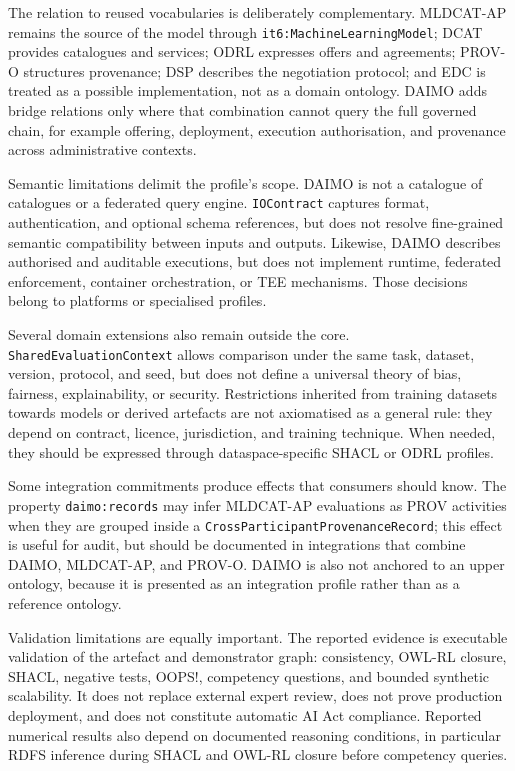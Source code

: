 \documentclass[Afour,sagev,times]{sagej}
\newcommand{\code}[1]{\texttt{#1}}
\begin{document}
The relation to reused vocabularies is deliberately complementary. MLDCAT-AP remains the source of the model through \code{it6:MachineLearningModel}; DCAT provides catalogues and services; ODRL expresses offers and agreements; PROV-O structures provenance; DSP describes the negotiation protocol; and EDC is treated as a possible implementation, not as a domain ontology. DAIMO adds bridge relations only where that combination cannot query the full governed chain, for example offering, deployment, execution authorisation, and provenance across administrative contexts.

Semantic limitations delimit the profile's scope. DAIMO is not a catalogue of catalogues or a federated query engine. \code{IOContract} captures format, authentication, and optional schema references, but does not resolve fine-grained semantic compatibility between inputs and outputs. Likewise, DAIMO describes authorised and auditable executions, but does not implement runtime, federated enforcement, container orchestration, or TEE mechanisms. Those decisions belong to platforms or specialised profiles.

Several domain extensions also remain outside the core. \code{SharedEvaluationContext} allows comparison under the same task, dataset, version, protocol, and seed, but does not define a universal theory of bias, fairness, explainability, or security. Restrictions inherited from training datasets towards models or derived artefacts are not axiomatised as a general rule: they depend on contract, licence, jurisdiction, and training technique. When needed, they should be expressed through dataspace-specific SHACL or ODRL profiles.

Some integration commitments produce effects that consumers should know. The property \code{daimo:records} may infer MLDCAT-AP evaluations as PROV activities when they are grouped inside a \code{CrossParticipantProvenanceRecord}; this effect is useful for audit, but should be documented in integrations that combine DAIMO, MLDCAT-AP, and PROV-O. DAIMO is also not anchored to an upper ontology, because it is presented as an integration profile rather than as a reference ontology.

Validation limitations are equally important. The reported evidence is executable validation of the artefact and demonstrator graph: consistency, OWL-RL closure, SHACL, negative tests, OOPS!, competency questions, and bounded synthetic scalability. It does not replace external expert review, does not prove production deployment, and does not constitute automatic AI Act compliance. Reported numerical results also depend on documented reasoning conditions, in particular RDFS inference during SHACL and OWL-RL closure before competency queries.
\end{document}
